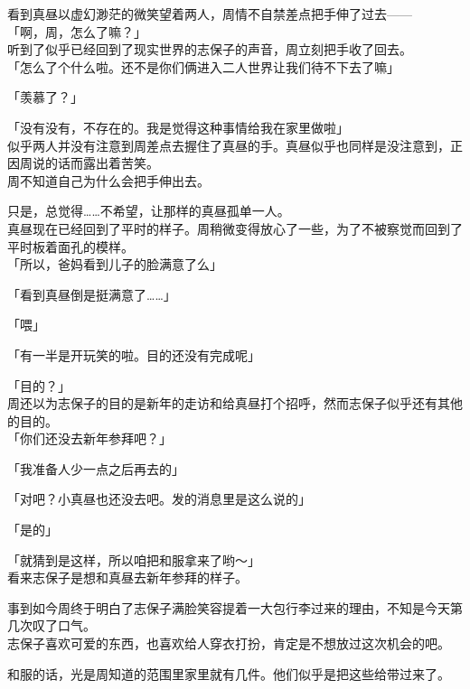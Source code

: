 看到真昼以虚幻渺茫的微笑望着两人，周情不自禁差点把手伸了过去——\\

「啊，周，怎么了嘛？」\\

听到了似乎已经回到了现实世界的志保子的声音，周立刻把手收了回去。\\

「怎么了个什么啦。还不是你们俩进入二人世界让我们待不下去了嘛」

「羡慕了？」

「没有没有，不存在的。我是觉得这种事情给我在家里做啦」\\

似乎两人并没有注意到周差点去握住了真昼的手。真昼似乎也同样是没注意到，正因周说的话而露出着苦笑。\\

周不知道自己为什么会把手伸出去。

只是，总觉得……不希望，让那样的真昼孤单一人。\\

真昼现在已经回到了平时的样子。周稍微变得放心了一些，为了不被察觉而回到了平时板着面孔的模样。\\

「所以，爸妈看到儿子的脸满意了么」

「看到真昼倒是挺满意了……」

「喂」

「有一半是开玩笑的啦。目的还没有完成呢」

「目的？」\\

周还以为志保子的目的是新年的走访和给真昼打个招呼，然而志保子似乎还有其他的目的。\\

「你们还没去新年参拜吧？」

「我准备人少一点之后再去的」

「对吧？小真昼也还没去吧。发的消息里是这么说的」

「是的」

「就猜到是这样，所以咱把和服拿来了哟～」\\

看来志保子是想和真昼去新年参拜的样子。

事到如今周终于明白了志保子满脸笑容提着一大包行李过来的理由，不知是今天第几次叹了口气。\\

志保子喜欢可爱的东西，也喜欢给人穿衣打扮，肯定是不想放过这次机会的吧。

和服的话，光是周知道的范围里家里就有几件。他们似乎是把这些给带过来了。\\


